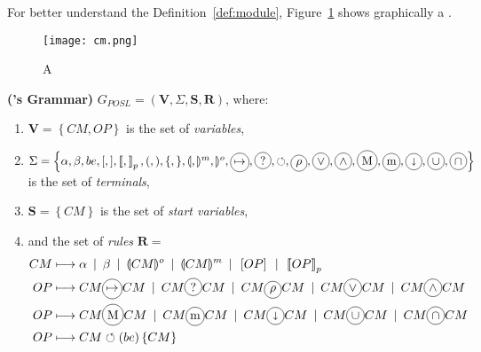 For better understand the Definition~\ref{def:module}, Figure~\ref{fig:cm} shows graphically a \cm.

\begin{figure}[h]
	\centering
	\texttt{[image: cm.png]}
	\caption[]{A \cm}
	\label{fig:cm}
\end{figure}


\begin{definition}{\bf (\posl's Grammar)}
\label{def:grammar}
$G_{POSL} = \left(\mathbf{V},\Sigma, \mathbf{S}, \mathbf{R}\right)$, where:
\begin{enumerate}\renewcommand{\labelitemi}{\scriptsize$\blacksquare$}
	\item $\mathbf{V} = \left\{CM, OP\right\}$ is the set of {\it variables},
	\item $\Sigma = \left\{\alpha, \beta, be, [, ], \lbk, \rbk_p, (, ), \{, \}, \llparenthesis, \rrparenthesis^m, \rrparenthesis^o, \circled{$\mapsto$},\circled{?},\circlearrowleft, \circled{$\rho$}, \circled{$\vee$}, \circled{$\wedge$}, \circled{M}, \circled{m}, \circled{$\shortdownarrow$}, \circled{$\cup$}, \circled{$\cap$}\right\}$ is the set of {\it terminals},
	\item $\mathbf{S} = \left\{CM\right\}$ is the set of {\it start variables},
	\item and the set of {\it rules} $\mathbf{R} = $
		\begin{align*} 
		CM &\longmapsto \alpha \OR \beta \OR \llparenthesis CM \rrparenthesis^o \OR \llparenthesis CM \rrparenthesis^m \OR \left[OP\right] \OR \lbk OP\rbk_p \\
		OP &\longmapsto CM \circled{$\mapsto$} CM \OR CM \circled{?} CM \OR CM \circled{$\rho$} CM \OR CM \circled{$\vee$} CM \OR CM \circled{$\wedge$} CM\\
		OP &\longmapsto CM \circled{M} CM \OR CM \circled{m} CM \OR CM \circled{$\shortdownarrow$} CM \OR CM \circled{$\cup$} CM \OR CM \circled{$\cap$} CM \\
		OP &\longmapsto CM \circlearrowleft (be) \left\{CM\right\}		
		\end{align*}
\end{enumerate} 
\end{definition}

